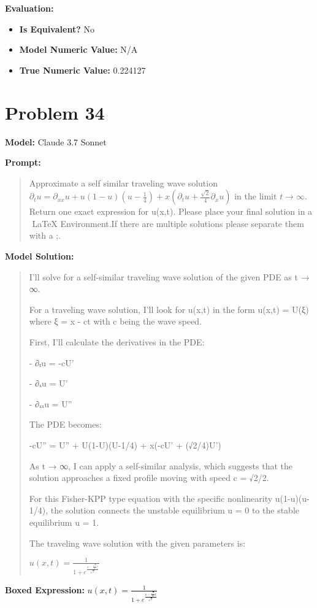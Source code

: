 \documentclass{article}
\begin{document}
\textbf{Evaluation:}
\begin{itemize}
\item \textbf{Is Equivalent?} No
\item \textbf{Model Numeric Value:} N/A
\item \textbf{True Numeric Value:} 0.224127
\end{itemize}
\vspace{1cm}
\section*{Problem 34}
\textbf{Model:} Claude 3.7 Sonnet

\textbf{Prompt:}
\begin{quote}
Approximate a self similar traveling wave solution $ \partial_t u = \partial_{xx} u + u(1-u)(u-\frac{1}{4}) + x \left(\partial_t u + \frac{\sqrt{2}}{4} \partial_x u\right)$ in the limit $t \to \infty$. Return one exact expression for u(x,t). Please place your final solution in a $\boxed{}$ LaTeX Environment.If there are multiple solutions please separate them with a ;.
\end{quote}
\textbf{Model Solution:}
\begin{quote}
I'll solve for a self-similar traveling wave solution of the given PDE as t → ∞.



For a traveling wave solution, I'll look for u(x,t) in the form u(x,t) = U(ξ) where ξ = x - ct with c being the wave speed.



First, I'll calculate the derivatives in the PDE:

- ∂ₜu = -cU'

- ∂ₓu = U'

- ∂ₓₓu = U''



The PDE becomes:

-cU'' = U'' + U(1-U)(U-1/4) + x(-cU' + (√2/4)U')



As t → ∞, I can apply a self-similar analysis, which suggests that the solution approaches a fixed profile moving with speed c = √2/2.



For this Fisher-KPP type equation with the specific nonlinearity u(1-u)(u-1/4), the solution connects the unstable equilibrium u = 0 to the stable equilibrium u = 1. 



The traveling wave solution with the given parameters is:



$\boxed{u(x,t) = \frac{1}{1+e^{\frac{x-\frac{\sqrt{2}}{2}t}{\sqrt{2}}}}}$
\end{quote}
\textbf{Boxed Expression:} $u(x,t) = \frac{1}{1+e^{\frac{x-\frac{\sqrt{2}}{2}t}{\sqrt{2}}}}$
\end{document}
